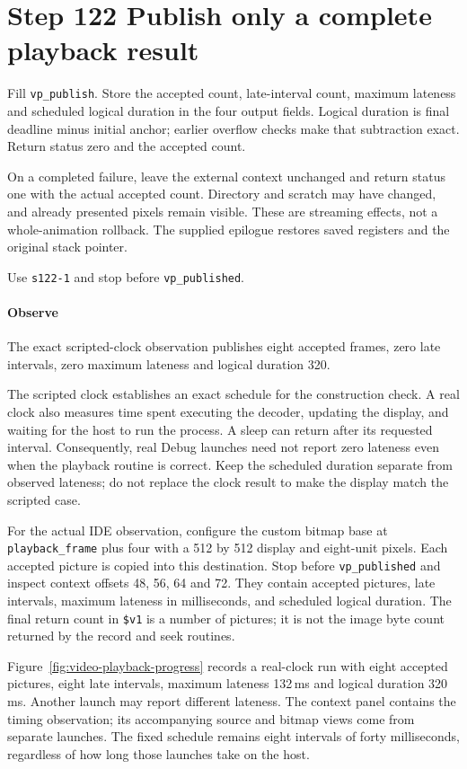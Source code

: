 \section{Step 122 Publish only a complete playback result}
Fill \texttt{vp\_publish}. Store the accepted count, late-interval count, maximum lateness and scheduled logical duration in the four output fields. Logical duration is final deadline minus initial anchor; earlier overflow checks make that subtraction exact. Return status zero and the accepted count.

On a completed failure, leave the external context unchanged and return status one with the actual accepted count. Directory and scratch may have changed, and already presented pixels remain visible. These are streaming effects, not a whole-animation rollback. The supplied epilogue restores saved registers and the original stack pointer.

Use \texttt{s122-1} and stop before \texttt{vp\_published}.

\paragraph{Observe} The exact scripted-clock observation publishes eight accepted frames, zero late intervals, zero maximum lateness and logical duration 320.

The scripted clock establishes an exact schedule for the construction check.
A real clock also measures time spent executing the decoder, updating the display,
and waiting for the host to run the process. A sleep can return after its requested
interval. Consequently, real Debug launches need not report zero lateness even when
the playback routine is correct. Keep the scheduled duration separate from observed
lateness; do not replace the clock result to make the display match the scripted case.

For the actual IDE observation, configure the custom bitmap base at
\texttt{playback\_frame} plus four with a 512 by 512 display and eight-unit pixels.
Each accepted picture is copied into this destination. Stop before
\texttt{vp\_published} and inspect context offsets 48, 56, 64 and 72. They contain
accepted pictures, late intervals, maximum lateness in milliseconds, and scheduled
logical duration. The final return count in \texttt{\$v1} is a number of pictures;
it is not the image byte count returned by the record and seek routines.

Figure~\ref{fig:video-playback-progress} records a real-clock run with eight
accepted pictures, eight late intervals, maximum lateness 132\,ms and logical
duration 320\,ms. Another launch may report different lateness. The context panel
contains the timing observation; its accompanying source and bitmap views come
from separate launches. The fixed schedule remains eight intervals of forty
milliseconds, regardless of how long those launches take on the host.

